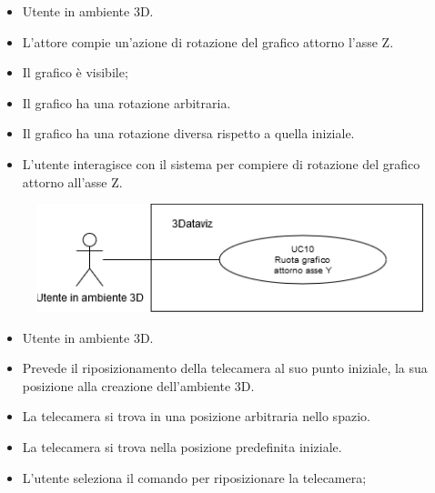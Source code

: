 \UCdsc
{ %
    \begin{itemize}
        \item Utente in ambiente 3D.
    \end{itemize}
}
{ %
    \begin{itemize}
        \item L'attore compie un'azione di rotazione del grafico attorno l'asse Z.
    \end{itemize}
}
{ %
    \begin{itemize}
        \item Il grafico è visibile;
        \item Il grafico ha una rotazione arbitraria.
    \end{itemize}
}
{ %
    \begin{itemize}
        \item Il grafico ha una rotazione diversa rispetto a quella iniziale.
    \end{itemize}
}
{ %
    \begin{itemize}
        \item L'utente interagisce con il sistema per compiere di rotazione del grafico attorno all'asse Z.
    \end{itemize}
}
    
\begin{figure}[h!]\centering
    \includegraphics[scale=0.7]{template/images/UC10.png}
    \caption{}
\end{figure}
\UCdsc
{ %
    \begin{itemize}
        \item Utente in ambiente 3D.
    \end{itemize}
}
{ %
    \begin{itemize}
        \item Prevede il riposizionamento della telecamera al suo punto iniziale, la sua posizione alla creazione dell'ambiente 3D.
    \end{itemize}
}
{ %
    \begin{itemize}
        \item La telecamera si trova in una posizione arbitraria nello spazio.
    \end{itemize}
}
{ %
    \begin{itemize}
        \item La telecamera si trova nella posizione predefinita iniziale.
    \end{itemize}
}
{ %
    \begin{itemize}
        \item L'utente seleziona il comando per riposizionare la telecamera;
    \end{itemize}
}

